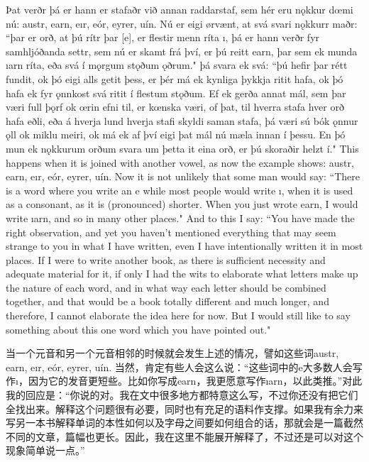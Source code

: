 \begin{paracol}{2}
    Þat verðr þá er hann er stafaðr við annan raddarstaf, sem hér eru nǫkkur dœmi nú: austr, earn, eır, eór, eyrer, uín. Nú er eigi ørvænt, at svá svari nǫkkurr maðr: ``þar er orð, at þú rítr þar [e], er flestir menn ríta ı, þá er hann verðr fyr samhljóðanda settr, sem nú er skamt frá því, er þú reitt earn, þar sem ek munda ıarn ríta, eða svá í mǫrgum stǫðum ǫðrum." þá svara ek svá: ``þú hefir þar rétt fundit, ok þó eigi alls getit þess, er þér má ek kynliga þykkja ritit hafa, ok þó hafa ek fyr ǫnnkost svá ritit í flestum stǫðum. Ef ek gerða annat mál, sem þar væri full þǫrf ok œrin efni til, er kœnska væri, of þat, til hverra stafa hver orð hafa eðli, eða á hverja lund hverja stafi skyldi saman stafa, þá væri sú bók ǫnnur ǫll ok miklu meiri, ok má ek af því eigi þat mál nú mæla innan í þessu. En þó mun ek nǫkkurum orðum svara um þetta it eina orð, er þú skoraðir helzt í."
    \switchcolumn
    This happens when it is joined with another vowel, as now the example shows: austr, earn, eır, eór, eyrer, uín. Now it is not unlikely that some man would say: ``There is a word where you write an e while most people would write ı, when it is used as a consonant, as it is (pronounced) shorter. When you just wrote earn, I would write ıarn, and so in many other places." And to this I say: ``You have made the right observation, and yet you haven't mentioned everything that may seem strange to you in what I have written, even I have intentionally written it in most places. If I were to write another book, as there is sufficient necessity and adequate material for it, if only I had the wits to elaborate what letters make up the nature of each word, and in what way each letter should be combined together, and that would be a book totally different and much longer, and therefore, I cannot elaborate the idea here for now. But I would still like to say something about this one word which you have pointed out."
\end{paracol}
\begin{translation*}{}
    当一个元音和另一个元音相邻的时候就会发生上述的情况，譬如这些词austr, earn, eır, eór, eyrer, uín. 当然，肯定有些人会这么说：“这些词中的e大多数人会写作ı，因为它的发音更短些。比如你写成earn，我更愿意写作ıarn，以此类推。”对此我的回应是：“你说的对。我在文中很多地方都特意这么写，不过你还没有把它们全找出来。解释这个问题很有必要，同时也有充足的语料作支撑。如果我有余力来写另一本书解释单词的本性如何以及字母之间要如何组合的话，那就会是一篇截然不同的文章，篇幅也更长。因此，我在这里不能展开解释了，不过还是可以对这个现象简单说一点。”
\end{translation*}
